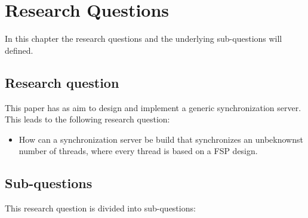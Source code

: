 \hypertarget{research-questions}{%
\chapter{Research Questions}\label{research-questions}}

In this chapter the research questions and the underlying sub-questions
will defined.

\hypertarget{research-question}{%
\section{Research question}\label{research-question}}

This paper has as aim to design and implement a generic synchronization
server. This leads to the following research question:

\begin{itemize}
\tightlist
\item
  How can a synchronization server be build that synchronizes an
  unbeknownst number of threads, where every thread is based on a FSP
  design.
\end{itemize}

\hypertarget{sub-questions}{%
\section{Sub-questions}\label{sub-questions}}

This research question is divided into sub-questions:

